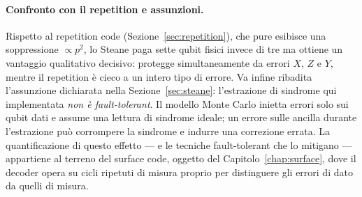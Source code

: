 \begin{onehalfspace}
\paragraph{Confronto con il repetition e assunzioni.}
Rispetto al repetition code (Sezione~\ref{sec:repetition}), che pure esibisce una soppressione $\propto p^2$, lo Steane paga sette qubit fisici invece di tre ma ottiene un vantaggio qualitativo decisivo: protegge simultaneamente da errori $X$, $Z$ e $Y$, mentre il repetition è cieco a un intero tipo di errore. Va infine ribadita l'assunzione dichiarata nella Sezione~\ref{sec:steane}: l'estrazione di sindrome qui implementata \emph{non è fault-tolerant}. Il modello Monte Carlo inietta errori solo sui qubit dati e assume una lettura di sindrome ideale; un errore sulle ancilla durante l'estrazione può corrompere la sindrome e indurre una correzione errata. La quantificazione di questo effetto --- e le tecniche fault-tolerant che lo mitigano --- appartiene al terreno del surface code, oggetto del Capitolo~\ref{chap:surface}, dove il decoder opera su cicli ripetuti di misura proprio per distinguere gli errori di dato da quelli di misura.

\end{onehalfspace}
